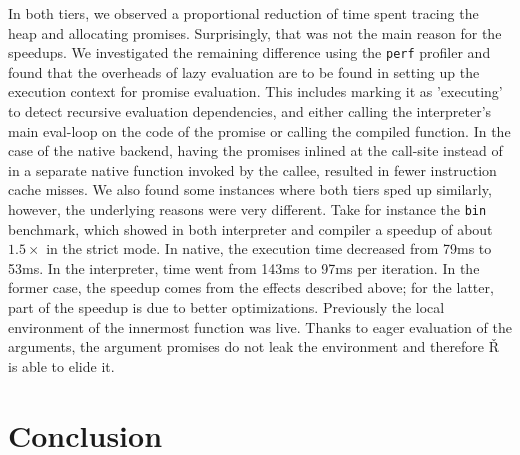 \documentclass[review,creen,acmsmall]{acmart}
\renewcommand{\Rsh}{{\sf\v R}\xspace}
\begin{document}
In both tiers, we observed a proportional reduction of time spent tracing the
heap and allocating promises. Surprisingly, that was not the main reason
for the speedups. We investigated the remaining difference using the
\lstinline{perf} profiler and found that the overheads of lazy evaluation are to
be found in setting up the execution context for promise evaluation. This
includes marking it as 'executing' to detect recursive evaluation dependencies,
and either calling the interpreter's main eval-loop on the code of the promise or
calling the compiled function. In the case of the native backend, having the
promises inlined at the call-site instead of in a separate native function
invoked by the callee, resulted in fewer instruction cache misses. We also found
some instances where both tiers sped up similarly, however, the underlying
reasons were very different. Take for instance the \lstinline{bin} benchmark,
which showed in both interpreter and compiler a speedup of about $1.5\times$ in
the strict mode. In native, the execution time decreased from 79ms to 53ms. In
the interpreter, time went from 143ms to 97ms per iteration. In the former case,
the speedup comes from the effects described above; for the latter, part of the
speedup is due to better optimizations. Previously the local environment of
the innermost function was live. Thanks to eager evaluation of the arguments,
the argument promises do not leak the environment and therefore \Rsh is able to
elide it.

\section{Conclusion}\label{sec:conclusion}
\end{document}
